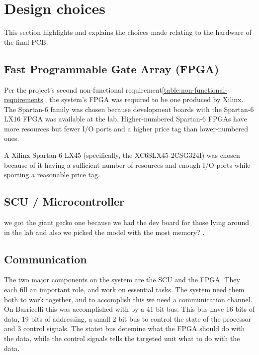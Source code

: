 \section{Design choices}
This section highlights and explains the choices made relating to the hardware of the final PCB.

\subsection{Fast Programmable Gate Array (FPGA)} \label{pcb:design-choices:ss:fpga}
Per the project's second non-functional requirement\vref{table:non-functional-requirements}, the system's FPGA was required to be one produced by Xilinx.
The Spartan-6 family was chosen because development boards with the Spartan-6 LX16 FPGA was available at the lab.
Higher-numbered Spartan-6 FPGAs have more resources but fewer I/O ports and a higher price tag than lower-numbered ones.

A Xilinx Spartan-6 LX45 (specifically, the XC6SLX45-2CSG324I) was chosen because of it having a sufficient number of resources and enough I/O ports while sporting a reasonable price tag.


\subsection{SCU / Microcontroller} \label{pcb:design-choices:ss:scu}
we got the giant gecko one because we had the dev board for those lying around in the lab and also we picked the model with the most memory? .


\subsection{Communication} \label{pcb:design-choices:ss:internal_communication}
The two major components on the system are the SCU and the FPGA.
They each fill an important role, and work on essential tasks.
The system need them both to work together, and to accomplish this we need a communication channel.
On Barricelli this was accomplished with by a 41 bit bus.
This bus have 16 bits of data, 19 bits of addressing, a small 2 bit bus to control the state of the processor and 3 control signals.
The statet bus detemine what the FPGA should do with the data, while the control signals tells the targeted unit what to do with the data. 


